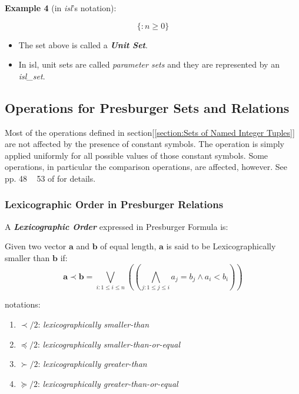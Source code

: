 \textbf{Example 4} (in \emph{isl}'s notation):

$$\{ :n \ge 0\}$$

\begin{itemize}
  \item The set above is called a \textcolor{vr}{\textbf{\emph{Unit Set}}}.
  \item In isl, unit sets are called \emph{parameter sets} and they are represented by an \textcolor{pg}{\emph{isl\_set}}.
\end{itemize}

\subsection{Operations for Presburger Sets and Relations}

Most of the operations defined in section[\ref{section:Sets of Named Integer Tuples}] are not affected by the presence of constant symbols. The operation is simply applied uniformly for all possible values of those constant symbols. Some operations, in particular the comparison operations, are affected, however. See pp. 48 ~ 53 of \cite{verdoolaege2016presburger} for details.

\subsubsection{Lexicographic Order in Presburger Relations}

\textcolor{vr}{A \textbf{\emph{Lexicographic Order}}} expressed in Presburger Formula is:

Given two vector $\mathbf{a}$ and $\mathbf{b}$ of equal length, $\mathbf{a}$ is said to be Lexicographically smaller than $\mathbf{b}$ if:
$$ \mathbf{a} \prec \mathbf{b} =
\bigvee_{i: 1\le i \le n} \left( \left(  \bigwedge_{j: 1 \le j \le i} a_j = b_j \wedge a_i < b_i\right) \right)$$

notations:

\begin{enumerate}
  \item $\prec/2$: \emph{lexicographically smaller-than}
  \item $\preccurlyeq/2$: \emph{lexicographically smaller-than-or-equal}
  \item $\succ /2$: \emph{lexicographically greater-than}
  \item $\succcurlyeq /2$: \emph{lexicographically greater-than-or-equal}
\end{enumerate}

